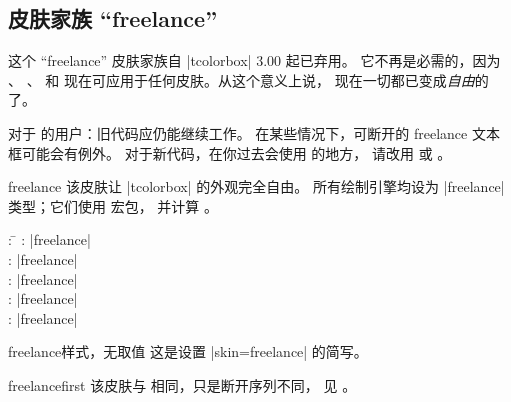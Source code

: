 \subsection{皮肤家族 \enquote{freelance}}
\begin{marker}
这个 \enquote{freelance} 皮肤家族自 |tcolorbox| 3.00 起已弃用。
它不再是必需的，因为 、
、
 和
 现在可应用于任何皮肤。从这个意义上说，
现在一切都已变成\emph{自由}的了。\par
对于  的用户：旧代码应仍能继续工作。
在某些情况下，可断开的 freelance 文本框可能会有例外。
对于新代码，在你过去会使用  的地方，
请改用  或 。
\end{marker}

\begin{docSkin}{freelance}
  该皮肤让 |tcolorbox| 的外观完全自由。
  所有绘制引擎均设为 |freelance| 类型；它们使用  宏包，
  并计算 。
\begin{tcolorbox}[skintable=freelance]
  \begin{tabbing}
    : \=\kill
    :           \> |freelance|\\
    : \> |freelance|\\ 
    :        \> |freelance|\\
    :    \> |freelance|\\
    :           \> |freelance|
  \end{tabbing}
\end{tcolorbox}
\end{docSkin}

\begin{docTcbKey}{freelance}{}{样式，无取值}
  这是设置 |skin=freelance| 的简写。
\end{docTcbKey}

\begin{docSkin}{freelancefirst}
  该皮肤与  相同，只是断开序列不同，
  见 。
\end{docSkin}

